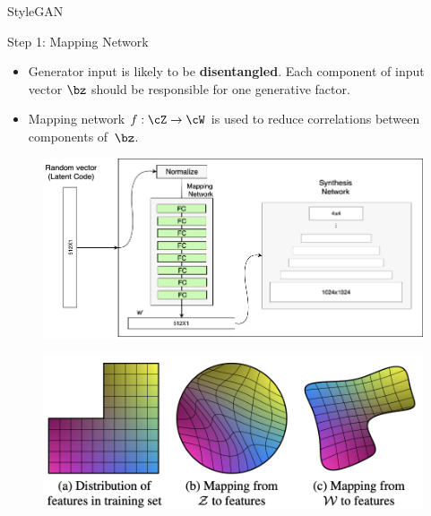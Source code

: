 \begin{frame}{StyleGAN}
	\begin{block}{Step 1: Mapping Network}
		\begin{itemize}
			\item Generator input is likely to be \textbf{disentangled}.  Each component of input vector $\bz$ should be responsible for one generative factor.
			\item Mapping network $f: \cZ \rightarrow \cW$ is used to reduce correlations between components of~$\bz$.
		\end{itemize}
		\begin{minipage}[t]{0.6\columnwidth}
			\begin{figure}
				\centering
				\includegraphics[width=0.98\linewidth]{figs/stylegan_mapping}
			\end{figure}
		\end{minipage}%
		\begin{minipage}[t]{0.38\columnwidth}
			\begin{figure}
				\centering
				\includegraphics[width=1.0\linewidth]{figs/stylegan_curved}
			\end{figure}
		\end{minipage}
	\vspace{0.3cm}
	\end{block}

\end{frame}
